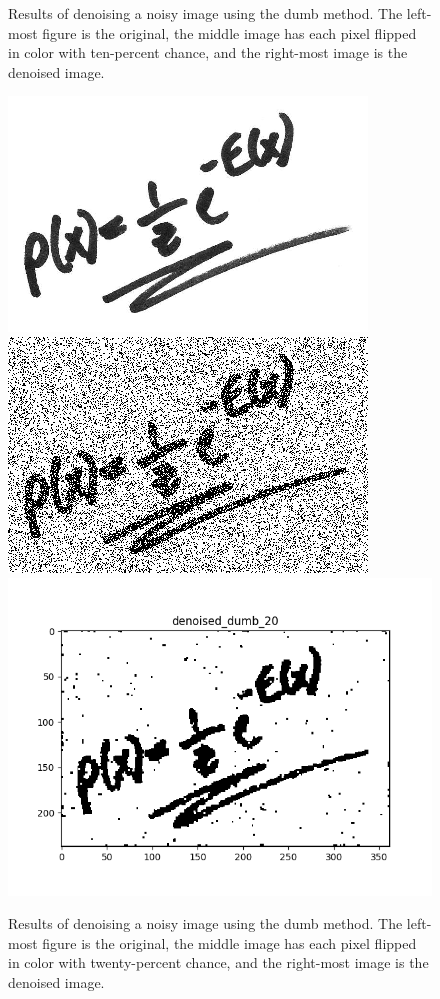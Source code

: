\documentclass[12pt]{article}
\begin{document}
\begin{enumerate}[label=(\alph*)]
\begin{figure}[!ht]
\caption{Results of denoising a noisy image using the dumb method. The left-most figure is the original, the middle image has each pixel flipped in color with ten-percent chance, and the right-most image is the denoised image.}
\label{fig:denoised_dumb_10}
\end{figure}

\begin{figure}[!ht]
\centering
\includegraphics[scale=0.33]{programming/orig.png}
\includegraphics[scale=0.33]{programming/noisy_20.png}
\includegraphics[scale=0.33]{programming/denoised_dumb_20.png}
\caption{Results of denoising a noisy image using the dumb method. The left-most figure is the original, the middle image has each pixel flipped in color with twenty-percent chance, and the right-most image is the denoised image.}
\label{fig:denoised_dumb_20}
\end{figure}


\end{enumerate}
\end{document}
